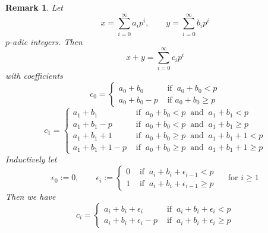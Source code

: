 \documentclass[11pt]{book}
\newtheorem{remark}[theorem]{Remark}
\theoremstyle{nonumberbreak}
\begin{document}
\begin{spacing}{1.3}
\begin{remark}%
Let
$$x= \sum_{i=0}^{\infty} a_i p^{i}, \qquad y=\sum_{i=0}^{\infty} b_i p^{i}$$
$p$-adic integers. Then 
$$x+y = \sum_{i=0}^{\infty} c_i p^{i}$$
with coefficients
$$c_0=\begin{cases} a_0+b_0 & \textrm{ if }\ a_0+b_0 <p \\ a_0+b_0-p & \textrm{ if } a_0+b_0 \geqslant p\end{cases}$$
$$c_1=\begin{cases} a_1+b_1 & \textrm{ if }\ a_0+b_0 <p \ \textrm{ and } \ a_1+b_1 < p \\
a_1+b_1-p & \textrm{ if } \ a_0+b_0<p \ \textrm{ and } \ a_1+b_1 \geqslant p \\
a_1+b_1+1 & \textrm{ if } \ a_0+b_0 \geqslant p \ \textrm{ and } \ a_1+b_1 +1 <p \\
a_1+b_1+1-p & \textrm{ if } \ a_0+b_0 \geqslant p \ \textrm{ and } \ a_1+b_1+1 \geqslant p \end{cases}$$
Inductively let 
$$\epsilon_0:=0,\qquad \epsilon_i:= \begin{cases} 0 & \textrm{ if } \ a_i+b_i + \epsilon_{i-1} < p \\ 1 & \textrm{ if } \ a_i + b_i + \epsilon_{i-1}\geqslant p \end{cases} \quad \textrm{ for } i \geqslant 1$$ 
Then we have
$$c_i=\begin{cases} a_i+b_i+\epsilon_i & \textrm{ if } \ a_i + b_i + \epsilon_i < p \\ a_i + b_i + \epsilon_i - p & \textrm{ if } \ a_i+b_i+\epsilon_i \geqslant p \end{cases}$$
\end{remark}



\end{spacing}
\end{document}
